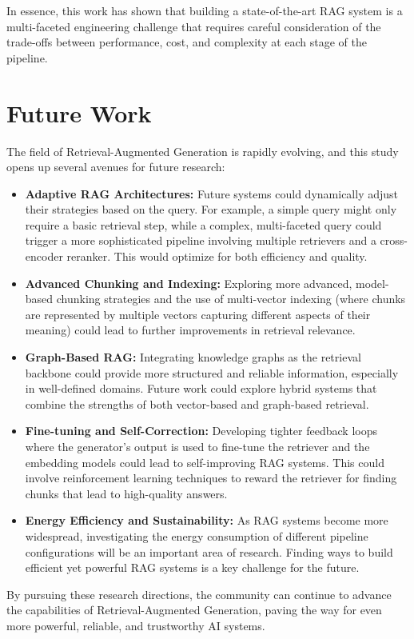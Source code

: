 In essence, this work has shown that building a state-of-the-art RAG system is a multi-faceted engineering challenge that requires careful consideration of the trade-offs between performance, cost, and complexity at each stage of the pipeline.

\section{Future Work}
The field of Retrieval-Augmented Generation is rapidly evolving, and this study opens up several avenues for future research:
\begin{itemize}
    \item \textbf{Adaptive RAG Architectures:} Future systems could dynamically adjust their strategies based on the query. For example, a simple query might only require a basic retrieval step, while a complex, multi-faceted query could trigger a more sophisticated pipeline involving multiple retrievers and a cross-encoder reranker. This would optimize for both efficiency and quality.
    \item \textbf{Advanced Chunking and Indexing:} Exploring more advanced, model-based chunking strategies and the use of multi-vector indexing (where chunks are represented by multiple vectors capturing different aspects of their meaning) could lead to further improvements in retrieval relevance.
    \item \textbf{Graph-Based RAG:} Integrating knowledge graphs as the retrieval backbone could provide more structured and reliable information, especially in well-defined domains. Future work could explore hybrid systems that combine the strengths of both vector-based and graph-based retrieval.
    \item \textbf{Fine-tuning and Self-Correction:} Developing tighter feedback loops where the generator's output is used to fine-tune the retriever and the embedding models could lead to self-improving RAG systems. This could involve reinforcement learning techniques to reward the retriever for finding chunks that lead to high-quality answers.
    \item \textbf{Energy Efficiency and Sustainability:} As RAG systems become more widespread, investigating the energy consumption of different pipeline configurations will be an important area of research. Finding ways to build efficient yet powerful RAG systems is a key challenge for the future.
\end{itemize}

By pursuing these research directions, the community can continue to advance the capabilities of Retrieval-Augmented Generation, paving the way for even more powerful, reliable, and trustworthy AI systems.